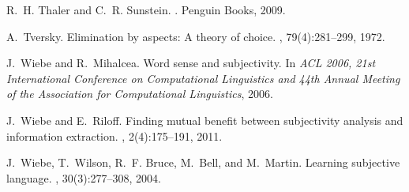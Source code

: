\documentclass[11pt]{article}
\begin{document}
\begin{thebibliography}{10}
\begin{small}
R.~H. Thaler and C.~R. Sunstein.
.
\newblock Penguin Books, 2009.

A.~Tversky.
\newblock Elimination by aspects: A theory of choice.
, 79(4):281--299, 1972.

J.~Wiebe and R.~Mihalcea.
\newblock Word sense and subjectivity.
\newblock In {\em {ACL} 2006, 21st International Conference on Computational
  Linguistics and 44th Annual Meeting of the Association for Computational
  Linguistics}, 2006.

J.~Wiebe and E.~Riloff.
\newblock Finding mutual benefit between subjectivity analysis and information
  extraction.
, 2(4):175--191, 2011.

J.~Wiebe, T.~Wilson, R.~F. Bruce, M.~Bell, and M.~Martin.
\newblock Learning subjective language.
, 30(3):277--308, 2004.

\end{small}
\end{thebibliography}
\end{document}
